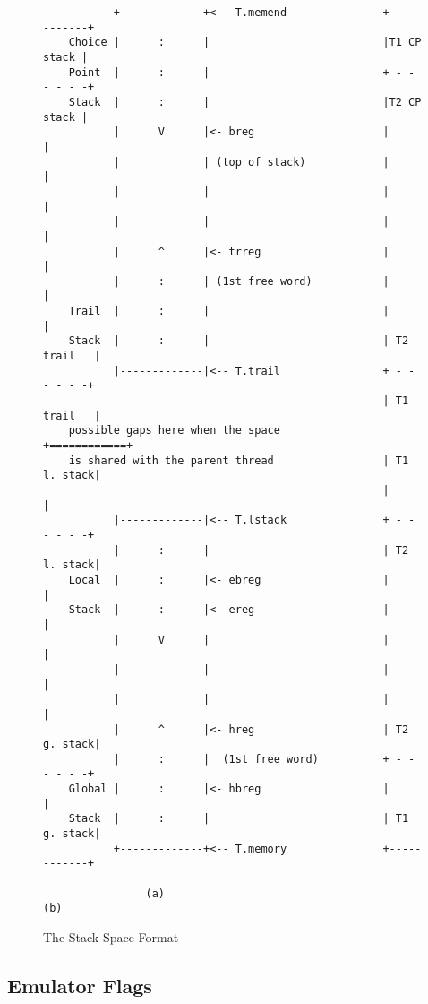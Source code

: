 \documentclass[11pt]{article}
\begin{document}
\begin{figure}
\begin{verbatim}
           +-------------+<-- T.memend               +------------+
    Choice |      :      |                           |T1 CP stack |
    Point  |      :      |                           + - - - - - -+
    Stack  |      :      |                           |T2 CP stack |
           |      V      |<- breg                    |            |
           |             | (top of stack)            |            |
           |             |                           |            |
           |             |                           |            |
           |      ^      |<- trreg                   |            |
           |      :      | (1st free word)           |            |
    Trail  |      :      |                           |            |
    Stack  |      :      |                           | T2 trail   |
           |-------------|<-- T.trail                + - - - - - -+
                                                     | T1 trail   |
    possible gaps here when the space                +============+
    is shared with the parent thread                 | T1 l. stack|
                                                     |            |
           |-------------|<-- T.lstack               + - - - - - -+
           |      :      |                           | T2 l. stack|
    Local  |      :      |<- ebreg                   |            |
    Stack  |      :      |<- ereg                    |            |
           |      V      |                           |            |
           |             |                           |            |
           |             |                           |            |
           |      ^      |<- hreg                    | T2 g. stack|
           |      :      |  (1st free word)          + - - - - - -+
    Global |      :      |<- hbreg                   |            |
    Stack  |      :      |                           | T1 g. stack|
           +-------------+<-- T.memory               +------------+

                (a)                                       (b)
\end{verbatim}
\caption{The Stack Space Format}
\label{f:stackspace}
\end{figure}


\subsection{Emulator Flags}
\end{document}
